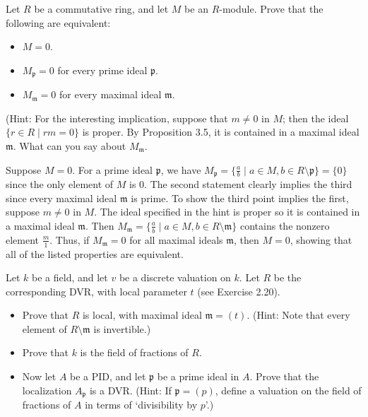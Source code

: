 \documentclass[../../master.tex]{subfiles}
\begin{document}
    \begin{problem}
        Let $R$ be a commutative ring, and let $M$ be an $R$-module. Prove that
        the following are equivalent:
        \begin{itemize}
            \item $M = 0$.
            \item $M_{\mathfrak{p}} = 0$ for every prime ideal $\mathfrak{p}$.
            \item $M_{\mathfrak{m}} = 0$ for every maximal ideal $\mathfrak{m}$.
        \end{itemize}
        (Hint: For the interesting implication, suppose that $m \neq 0$ in $M$;
        then the ideal $\{r \in R \mid rm = 0\}$ is proper. By Proposition 3.5,
        it is contained in a maximal ideal $\mathfrak{m}$. What can you say
        about $M_{\mathfrak{m}}$.
    \end{problem}

    \begin{solution}
        Suppose $M = 0$. For a prime ideal $\mathfrak{p}$, we have
        $M_{\mathfrak{p}} = \{\frac{a}{b} \mid a \in M, b \in R \setminus
        \mathfrak{p}\} = \{0\}$ since the only element of $M$ is 0. The second
        statement clearly implies the third since every maximal ideal
        $\mathfrak{m}$ is prime. To show the third point implies the first,
        suppose $m \neq 0$ in $M$. The ideal specified in the hint is proper so
        it is contained in a maximal ideal $\mathfrak{m}$. Then
        $M_{\mathfrak{m}} = \{\frac{a}{b} \mid a \in M, b \in R \setminus
            \mathfrak{m}\}$ contains the nonzero element $\frac{m}{1}$. Thus, if
            $M_{\mathfrak{m}} = 0$ for all maximal ideals $\mathfrak{m}$, then
            $M = 0$, showing that all of the listed properties are equivalent.
    \end{solution}

    \begin{problem}
        Let $k$ be a field, and let $v$ be a discrete valuation on $k$. Let $R$
        be the corresponding DVR, with local parameter  $t$ (see Exercise 2.20).
        \begin{itemize}
            \item Prove that $R$ is local, with maximal ideal $\mathfrak{m} =
                (t)$. (Hint: Note that every element of $R \setminus
                \mathfrak{m}$ is invertible.)
            \item Prove that $k$ is the field of fractions of $R$.
            \item Now let $A$ be a PID, and let $\mathfrak{p}$ be a prime ideal
                in $A$. Prove that the localization $A_{\mathfrak{p}}$ is a DVR.
                (Hint: If $\mathfrak{p} = (p)$, define a valuation on the field
                of fractions of $A$ in terms of `divisibility by $p$'.)
        \end{itemize}
    \end{problem}
\end{document}
